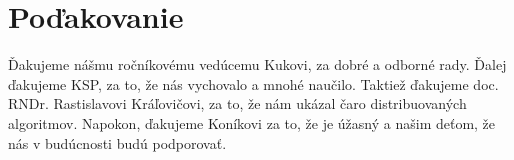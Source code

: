 \section*{Poďakovanie}

Ďakujeme nášmu ročníkovému vedúcemu Kukovi, za dobré a odborné rady. 
Ďalej ďakujeme KSP, za to, že nás vychovalo a mnohé naučilo. Taktiež ďakujeme doc. RNDr. Rastislavovi Kráľovičovi,
za to, že nám ukázal čaro distribuovaných algoritmov.
Napokon, ďakujeme Koníkovi za to, že je úžasný a našim deťom, že nás v budúcnosti budú podporovať.
